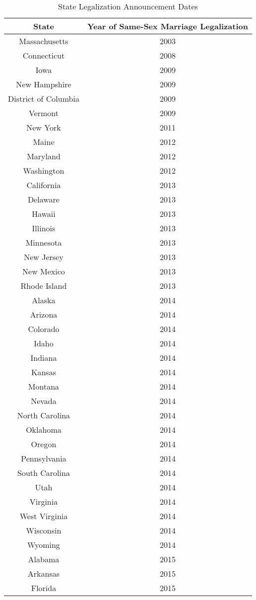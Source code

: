 \begin{longtable}{|c|c|} %
\caption{State Legalization Announcement Dates}
\label{tab:legal_date} 
\hline
\textbf{State} & \textbf{Year of Same-Sex Marriage Legalization} \\
\hline
Massachusetts & 2003 \\
Connecticut & 2008 \\
Iowa & 2009 \\
New Hampshire & 2009 \\
District of Columbia & 2009 \\
Vermont & 2009 \\
New York & 2011 \\
Maine & 2012 \\
Maryland & 2012 \\
Washington & 2012 \\
California & 2013 \\
Delaware & 2013 \\
Hawaii & 2013 \\
Illinois & 2013 \\
Minnesota & 2013 \\
New Jersey & 2013 \\
New Mexico & 2013 \\
Rhode Island & 2013 \\
Alaska & 2014 \\
Arizona & 2014 \\
Colorado & 2014 \\
Idaho & 2014 \\
Indiana & 2014 \\
Kansas & 2014 \\
Montana & 2014 \\
Nevada & 2014 \\
North Carolina & 2014 \\
Oklahoma & 2014 \\
Oregon & 2014 \\
Pennsylvania & 2014 \\
South Carolina & 2014 \\
Utah & 2014 \\
Virginia & 2014 \\
West Virginia & 2014 \\
Wisconsin & 2014 \\
Wyoming & 2014 \\
Alabama & 2015 \\
Arkansas & 2015 \\
Florida & 2015 \\

\end{longtable}
